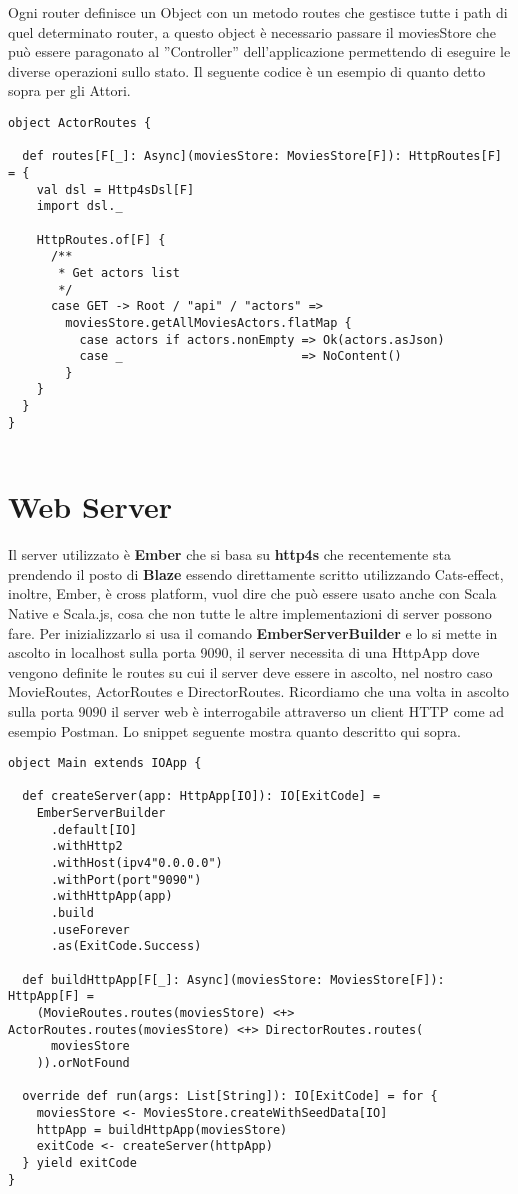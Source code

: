 \noindent Ogni router definisce un Object con un metodo routes che gestisce tutte i path di quel determinato router, a questo object è necessario passare il moviesStore che può essere paragonato al ”Controller” dell’applicazione permettendo di eseguire le diverse operazioni sullo stato. Il seguente codice è un esempio di quanto detto sopra per gli Attori.

\begin{verbatim}
object ActorRoutes {

  def routes[F[_]: Async](moviesStore: MoviesStore[F]): HttpRoutes[F] = {
    val dsl = Http4sDsl[F]
    import dsl._

    HttpRoutes.of[F] {
      /**
       * Get actors list
       */
      case GET -> Root / "api" / "actors" =>
        moviesStore.getAllMoviesActors.flatMap {
          case actors if actors.nonEmpty => Ok(actors.asJson)
          case _                         => NoContent()
        }
    }
  }
}
    
\end{verbatim}

\section{Web Server}
Il server utilizzato è \textbf{Ember} che si basa su \textbf{http4s} che recentemente sta prendendo il posto di \textbf{Blaze} essendo direttamente scritto utilizzando Cats-effect, inoltre, Ember, è cross platform, vuol dire che può essere usato anche con Scala Native e Scala.js, cosa che non tutte le altre implementazioni di server possono fare. Per inizializzarlo si usa il comando \textbf{EmberServerBuilder} e lo si mette in ascolto in localhost sulla porta 9090, il server necessita di una HttpApp dove vengono definite le routes su cui il server deve essere in ascolto, nel nostro caso MovieRoutes, ActorRoutes e DirectorRoutes. Ricordiamo che una volta in ascolto sulla porta 9090 il server web è interrogabile attraverso un client HTTP come ad esempio Postman. Lo snippet seguente mostra quanto descritto qui sopra. 

\begin{verbatim}
object Main extends IOApp {

  def createServer(app: HttpApp[IO]): IO[ExitCode] =
    EmberServerBuilder
      .default[IO]
      .withHttp2
      .withHost(ipv4"0.0.0.0")
      .withPort(port"9090")
      .withHttpApp(app)
      .build
      .useForever
      .as(ExitCode.Success)

  def buildHttpApp[F[_]: Async](moviesStore: MoviesStore[F]): HttpApp[F] =
    (MovieRoutes.routes(moviesStore) <+> ActorRoutes.routes(moviesStore) <+> DirectorRoutes.routes(
      moviesStore
    )).orNotFound

  override def run(args: List[String]): IO[ExitCode] = for {
    moviesStore <- MoviesStore.createWithSeedData[IO]
    httpApp = buildHttpApp(moviesStore)
    exitCode <- createServer(httpApp)
  } yield exitCode
}
    
\end{verbatim}

